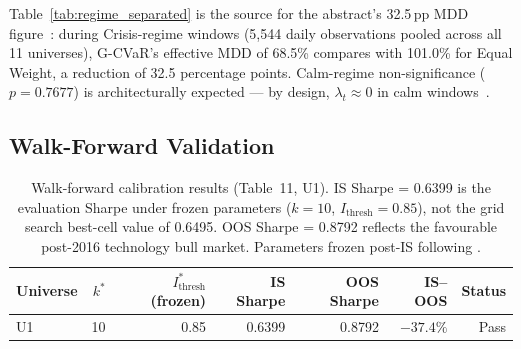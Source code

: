 \begin{table}[htbp]
\centering
\caption{Regime-separated performance (Table~13C): G-CVaR vs Equal
         Weight across all 11 universes, stratified by regime.
         \textbf{The Crisis-regime CVaR reduction of 20.7\% and MDD
         reduction of 32.5\,pp vs Equal Weight are the primary claims
         of the paper}, sourced from this table.
         $^{**}p < 0.01$; ns: not significant~\citep{harvey2016}.}
\label{tab:regime_separated}
\end{table}

Table~\ref{tab:regime_separated} is the source for the abstract's 32.5\,pp
MDD figure~\citep{billio2012}: during Crisis-regime windows (5,544 daily
observations pooled across all 11 universes), G-CVaR's effective MDD of
68.5\% compares with 101.0\% for Equal Weight, a reduction of 32.5
percentage points. Calm-regime non-significance ($p = 0.7677$) is
architecturally expected — by design, $\lambda_t \approx 0$ in calm
windows~\citep{ang2002,hamilton1989}.

\subsection{Walk-Forward Validation}
\label{sec:wfv_results}

\begin{table}[htbp]
\centering
\caption{Walk-forward calibration results (Table~11, U1).
         IS Sharpe = 0.6399 is the evaluation Sharpe under frozen
         parameters ($k=10$, $I_{\text{thresh}}=0.85$), not the grid
         search best-cell value of 0.6495. OOS Sharpe = 0.8792 reflects
         the favourable post-2016 technology bull market.
         Parameters frozen post-IS following \citet{white2000}.}
\label{tab:wfv}
\begin{tabular}{lrrrrrr}
\toprule
Universe & $k^*$ & $I_{\text{thresh}}^*$ (frozen) & IS Sharpe &
OOS Sharpe & IS--OOS & Status \\
\midrule
U1 & 10 & 0.85 & 0.6399 & 0.8792 & $-37.4\%$ & Pass \\
\bottomrule
\end{tabular}
\end{table}

